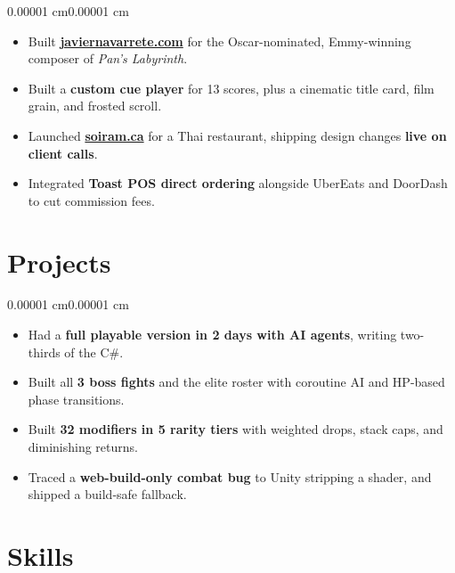 \documentclass[letterpaper]{article}
\newenvironment{highlights}{
    \begin{itemize}[
        topsep=0.115 cm,
        parsep=0.106 cm,
        partopsep=0pt,
        itemsep=0pt,
        leftmargin=10pt
    ]
}{
    \end{itemize}
}
\newenvironment{onecolentry}{
    \begin{adjustwidth}{0.00001 cm}{0.00001 cm}
}{
    \end{adjustwidth}
}
\begin{document}
    \vspace{0.246 cm}

    \begin{onecolentry}
        \begin{highlights}
            \item Built \href{https://javiernavarrete.com}{\textbf{javiernavarrete.com}} for the Oscar-nominated, Emmy-winning composer of \textit{Pan's Labyrinth}.
            \item Built a \textbf{custom cue player} for 13 scores, plus a cinematic title card, film grain, and frosted scroll.
            \item Launched \href{https://soiram.ca}{\textbf{soiram.ca}} for a Thai restaurant, shipping design changes \textbf{live on client calls}.
            \item Integrated \textbf{Toast POS direct ordering} alongside UberEats and DoorDash to cut commission fees.
        \end{highlights}
    \end{onecolentry}

    \section{Projects}

    \begin{onecolentry}
        \begin{highlights}
            \item Had a \textbf{full playable version in 2 days with AI agents}, writing two-thirds of the C\#.
            \item Built all \textbf{3 boss fights} and the elite roster with coroutine AI and HP-based phase transitions.
            \item Built \textbf{32 modifiers in 5 rarity tiers} with weighted drops, stack caps, and diminishing returns.
            \item Traced a \textbf{web-build-only combat bug} to Unity stripping a shader, and shipped a build-safe fallback.
        \end{highlights}
    \end{onecolentry}

    \section{Skills}
\end{document}
